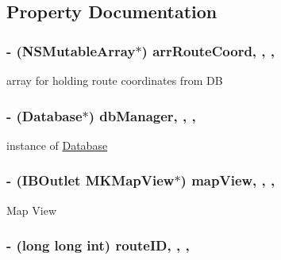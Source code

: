 \subsection{Property Documentation}
\hypertarget{interfaceRouteInfoViewController_a4f2d1dc4014af950cfad38306ca87d0e}{
\subsubsection[{arr\-Route\-Coord}]{\setlength{\rightskip}{0pt plus 5cm}-\/ (N\-S\-Mutable\-Array$\ast$) arr\-Route\-Coord\hspace{0.3cm}{\ttfamily [read]}, {\ttfamily [write]}, {\ttfamily [nonatomic]}, {\ttfamily [strong]}}}\label{interfaceRouteInfoViewController_a4f2d1dc4014af950cfad38306ca87d0e}
array for holding route coordinates from D\-B \hypertarget{interfaceRouteInfoViewController_abca6639d927411ab6d56c47859f42d85}{
\subsubsection[{db\-Manager}]{\setlength{\rightskip}{0pt plus 5cm}-\/ ({\bf Database}$\ast$) db\-Manager\hspace{0.3cm}{\ttfamily [read]}, {\ttfamily [write]}, {\ttfamily [nonatomic]}, {\ttfamily [strong]}}}\label{interfaceRouteInfoViewController_abca6639d927411ab6d56c47859f42d85}
instance of \hyperlink{interfaceDatabase}{Database} \hypertarget{interfaceRouteInfoViewController_a05fec55f48777eed52aea7872128648b}{
\subsubsection[{map\-View}]{\setlength{\rightskip}{0pt plus 5cm}-\/ (I\-B\-Outlet M\-K\-Map\-View$\ast$) map\-View\hspace{0.3cm}{\ttfamily [read]}, {\ttfamily [write]}, {\ttfamily [nonatomic]}, {\ttfamily [retain]}}}\label{interfaceRouteInfoViewController_a05fec55f48777eed52aea7872128648b}
Map View \hypertarget{interfaceRouteInfoViewController_ada165232dfcc705567763b8b5ad234c1}{
\subsubsection[{route\-I\-D}]{\setlength{\rightskip}{0pt plus 5cm}-\/ (long long int) route\-I\-D\hspace{0.3cm}{\ttfamily [read]}, {\ttfamily [write]}, {\ttfamily [nonatomic]}, {\ttfamily [assign]}}}\label{interfaceRouteInfoViewController_ada165232dfcc705567763b8b5ad234c1}
